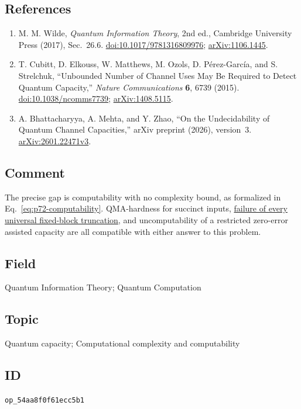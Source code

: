 \subsection*{References}

\begin{enumerate}[label={},leftmargin=4.8em,labelsep=0.5em]
  \footnotesize
  \item[\textup{[Wil17]}]\label{ref:p72-wilde}
  M. M. Wilde, \emph{Quantum Information Theory}, 2nd ed., Cambridge
  University Press (2017), Sec.~26.6.
  \href{https://doi.org/10.1017/9781316809976}{doi:10.1017/9781316809976};
  \href{https://arxiv.org/abs/1106.1445}{arXiv:1106.1445}.

  \item[\textup{[CEM+15]}]\label{ref:p72-cubitt-et-al}
  T. Cubitt, D. Elkouss, W. Matthews, M. Ozols, D. P\'erez-Garc\'ia, and
  S. Strelchuk, ``Unbounded Number of Channel Uses May Be Required to Detect
  Quantum Capacity,'' \emph{Nature Communications} \textbf{6}, 6739 (2015).
  \href{https://doi.org/10.1038/ncomms7739}{doi:10.1038/ncomms7739};
  \href{https://arxiv.org/abs/1408.5115}{arXiv:1408.5115}.

  \item[\textup{[BMZ26]}]\label{ref:p72-bhattacharyya-mehta-zhao}
  A. Bhattacharyya, A. Mehta, and Y. Zhao,
  ``On the Undecidability of Quantum Channel Capacities,'' arXiv preprint
  (2026), version~3.
  \href{https://arxiv.org/abs/2601.22471v3}{arXiv:2601.22471v3}.
\end{enumerate}

\subsection*{Comment}

The precise gap is computability with no complexity bound, as formalized in
Eq.~\eqref{eq:p72-computability}.  QMA-hardness for succinct inputs, \href{https://qiqc-op.com/problem/op_3ea0de34a1fe6e0b/}{failure of every universal fixed-block truncation}, and uncomputability of a restricted
zero-error assisted capacity are all compatible with either answer to this
problem.

\subsection*{Field}

Quantum Information Theory; Quantum Computation

\subsection*{Topic}

Quantum capacity; Computational complexity and computability

\subsection*{ID}

\texttt{op\_54aa8f0f61ecc5b1}
